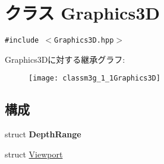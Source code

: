 \hypertarget{classm3g_1_1Graphics3D}{
\section{クラス Graphics3D}
\label{classm3g_1_1Graphics3D}
}
{\tt \#include $<$Graphics3D.hpp$>$}

Graphics3Dに対する継承グラフ:\begin{figure}[H]
\begin{center}
\leavevmode
\texttt{[image: classm3g\_1\_1Graphics3D]}
\end{center}
\end{figure}
\subsection*{構成}
\begin{CompactItemize}
\item 
struct \textbf{DepthRange}
\item 
struct \hyperlink{structm3g_1_1Graphics3D_1_1Viewport}{Viewport}
\end{CompactItemize}
